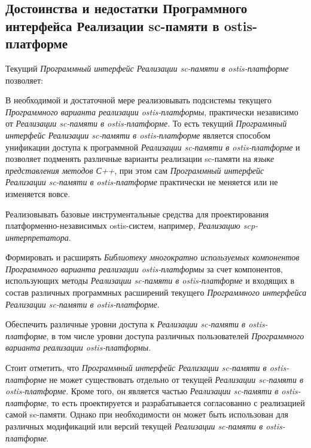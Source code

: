 \subsection{Достоинства и недостатки Программного интерфейса Реализации sc-памяти в ostis-платформе}
\label{sec_soft_platform_sc_memory_interface_problems}

Текущий \textit{Программный интерфейс Реализации sc-памяти в ostis-платформе} позволяет:
\begin{textitemize}
	\item В необходимой и достаточной мере реализовывать  подсистемы текущего \textit{Программного варианта реализации ostis-платформы}, практически независимо от \textit{Реализации sc-памяти в ostis-платформе}. То есть текущий \textit{Программный интерфейс Реализации sc-памяти в ostis-платформе} является способом унификации доступа к программной \textit{Реализации sc-памяти в ostis-платформе} и позволяет  подменять различные варианты реализации sc-памяти на \textit{языке представления методов} \textit{С++}, при этом сам \textit{Программный интерфейс Реализации sc-памяти в ostis-платформе} практически не меняется или не изменяется вовсе.
	\item Реализовывать базовые инструментальные средства для проектирования платформенно-независимых ostis-систем, например, \textit{Реализацию scp-интерпретатора}.
	\item Формировать и расширять \textit{Библиотеку многократно используемых компонентов Программного варианта реализации ostis-платформы} за счет компонентов, использующих методы \textit{Реализации sc-памяти в ostis-платформе} и входящих в состав различных программных расширений текущего \textit{Программного интерфейса Реализации sc-памяти в ostis-платформе}.
	\item Обеспечить различные уровни доступа к \textit{Реализации sc-памяти в ostis-платформе}, в том числе уровни доступа различных пользователей \textit{Программного варианта реализации ostis-платформы}. 
\end{textitemize}

Стоит отметить, что \textit{Программный интерфейс Реализации sc-памяти в ostis-платформе} не может существовать отдельно от текущей \textit{Реализации sc-памяти в ostis-платформе}. Кроме того, он является частью \textit{Реализации sc-памяти в ostis-платформе}, то есть проектируется и разрабатывается согласованно с реализацией самой sc-памяти. Однако при необходимости он может быть использован для различных модификаций или версий текущей \textit{Реализации sc-памяти в ostis-платформе}.

